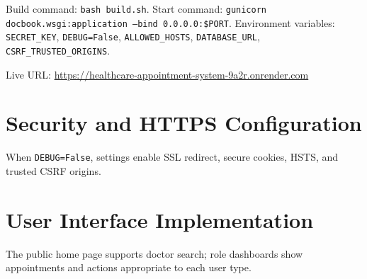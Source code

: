 Build command: \texttt{bash build.sh}. Start command: \texttt{gunicorn docbook.wsgi:application --bind 0.0.0.0:\$PORT}. Environment variables: \texttt{SECRET\_KEY}, \texttt{DEBUG=False}, \texttt{ALLOWED\_HOSTS}, \texttt{DATABASE\_URL}, \texttt{CSRF\_TRUSTED\_ORIGINS}.

Live URL: \url{https://healthcare-appointment-system-9a2r.onrender.com}

\section{Security and HTTPS Configuration}

When \texttt{DEBUG=False}, settings enable SSL redirect, secure cookies, HSTS, and trusted CSRF origins.

\section{User Interface Implementation}

The public home page supports doctor search; role dashboards show appointments and actions appropriate to each user type.
